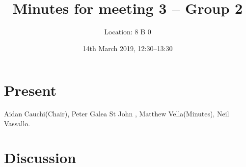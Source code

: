 \documentclass[11pt,a4paper]{article}
\title{ Minutes for meeting 3 -- Group 2}
\author{Location: 8 B 0}
\date{14th March 2019, 12:30--13:30}
\begin{document}
\maketitle

\section*{Present}
Aidan Cauchi(Chair),
Peter Galea St John ,
Matthew Vella(Minutes),
Neil Vassallo.



\section*{Discussion}
\end{document}
